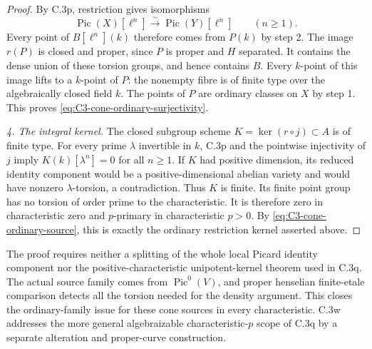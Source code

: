 \begin{proof}
By C.3p, restriction gives isomorphisms
\[
 \operatorname{Pic}(X)[\ell^n]
       \xrightarrow{\ \sim\ }
 \operatorname{Pic}(Y)[\ell^n]
                      \qquad(n\ge1).
\]
Every point of $B[\ell^n](k)$ therefore
comes from $P(k)$ by step 2.
The image $r(P)$ is closed and proper,
since $P$ is proper and $H$ separated.
It contains the dense union of these
torsion groups, and hence contains $B$.
Every $k$-point of this image lifts to a
$k$-point of $P$: the nonempty fibre is
of finite type over the algebraically
closed field $k$. The points of $P$
are ordinary classes on $X$ by step 1.
This proves
\eqref{eq:C3-cone-ordinary-surjectivity}.

\emph{4. The integral kernel.}
The closed subgroup scheme
$K=\ker(r\circ j)\subset A$ is of
finite type. For every prime $\lambda$
invertible in $k$, C.3p and the pointwise
injectivity of $j$ imply
$K(k)[\lambda^n]=0$ for all $n\ge1$.
If $K$ had positive dimension, its reduced
identity component would be a
positive-dimensional abelian variety and
would have nonzero $\lambda$-torsion,
a contradiction. Thus $K$ is finite.
Its finite point group has no torsion
of order prime to the characteristic.
It is therefore zero in characteristic
zero and $p$-primary in characteristic
$p>0$. By
\eqref{eq:C3-cone-ordinary-source}, this
is exactly the ordinary restriction
kernel asserted above.
\end{proof}

The proof requires neither a splitting
of the whole local Picard identity
component nor the positive-characteristic
unipotent-kernel theorem used in C.3q.
The actual source family comes from
$\operatorname{Pic}^0(V)$, and proper
henselian finite-etale comparison detects
all the torsion needed for the density
argument. This closes the ordinary-family
issue for these cone sources in every
characteristic. C.3w addresses the more
general algebraizable characteristic-$p$
scope of C.3q by a separate alteration
and proper-curve construction.
